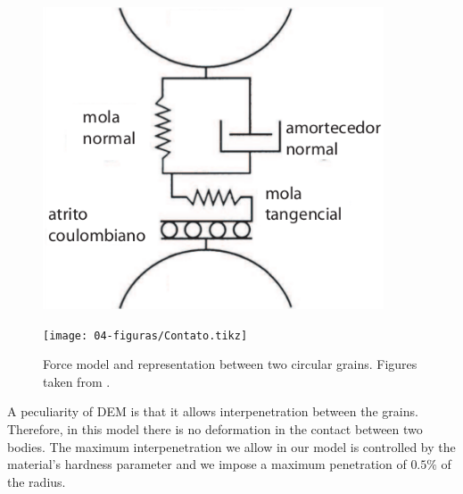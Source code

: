 \begin{figure}
    \begin{minipage}{.45\linewidth}
        \centering
        \includegraphics[width=0.9\textwidth]{04-figuras/Modelo_Forcas.png}
        \label{fig:forcas_modelo}
    \end{minipage}
    \begin{minipage}{.45\linewidth}
        \centering
        \texttt{[image: 04-figuras/Contato.tikz]}
        \label{fig:forcas_contato}
    \end{minipage}
    \caption[Contact force model.]{Force model and representation between two circular grains. Figures taken from \cite{Dissertacao}.}
    \label{fig:forcas}
\end{figure}


    A peculiarity of DEM is that it allows interpenetration between the grains. Therefore, in this model there is no deformation in the contact between two bodies. The maximum interpenetration we allow in our model is controlled by the material's hardness parameter and we impose a maximum penetration of $0.5\%$ of the radius.

